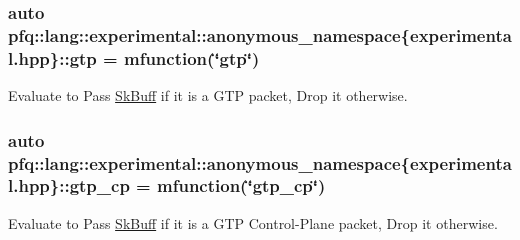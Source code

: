 \hypertarget{namespacepfq_1_1lang_1_1experimental_1_1anonymous__namespace_02experimental_8hpp_03_abd26824e1b0e6a31ddbba793b727ef8f}{
\subsubsection[{gtp}]{\setlength{\rightskip}{0pt plus 5cm}auto pfq\+::lang\+::experimental\+::anonymous\+\_\+namespace\{experimental.\+hpp\}\+::gtp = {\bf mfunction}(\char`\"{}gtp\char`\"{})}}\label{namespacepfq_1_1lang_1_1experimental_1_1anonymous__namespace_02experimental_8hpp_03_abd26824e1b0e6a31ddbba793b727ef8f}


Evaluate to {\ttfamily Pass} \hyperlink{structpfq_1_1lang_1_1SkBuff}{Sk\+Buff} if it is a G\+T\+P packet, {\ttfamily Drop} it otherwise. 

\hypertarget{namespacepfq_1_1lang_1_1experimental_1_1anonymous__namespace_02experimental_8hpp_03_a209a0ce5245cb37a38e0e4c6616e3604}{
\subsubsection[{gtp\+\_\+cp}]{\setlength{\rightskip}{0pt plus 5cm}auto pfq\+::lang\+::experimental\+::anonymous\+\_\+namespace\{experimental.\+hpp\}\+::gtp\+\_\+cp = {\bf mfunction}(\char`\"{}gtp\+\_\+cp\char`\"{})}}\label{namespacepfq_1_1lang_1_1experimental_1_1anonymous__namespace_02experimental_8hpp_03_a209a0ce5245cb37a38e0e4c6616e3604}


Evaluate to {\ttfamily Pass} \hyperlink{structpfq_1_1lang_1_1SkBuff}{Sk\+Buff} if it is a G\+T\+P Control-\/\+Plane packet, {\ttfamily Drop} it otherwise. 

